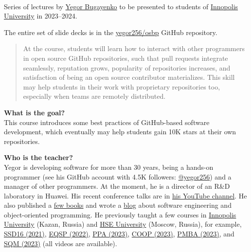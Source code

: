 \documentclass[nobrand,anonymous,nodate,nosecurity]{huawei}
\begin{document}
{\\
Series of lectures by \href{https://www.yegor256.com}{Yegor Bugayenko} to be presented
to students of \href{https://innopolis.university/en/}{Innopolis University} in 2023--2024.

The entire set of slide decks is in the \href{https://github.com/yegor256/osbp}{yegor256/osbp} GitHub repository.

\begin{abstract}
At the course, students will learn how to interact with other programmers
in open source GitHub repositories, such that pull requests integrate seamlessly,
reputation grows, popularity of repositories increases, and satisfaction
of being an open source contributor materializes. This skill may help students
in their work with proprietary repositories too, especially when teams
are remotely distributed.
\end{abstract}

\textbf{What is the goal?}\\
This course introduces some best practices of GitHub-based software development,
which eventually may help students gain 10K stars at their own repositories.

\textbf{Who is the teacher?}\\
Yegor is developing software for more than 30 years, being a hands-on programmer
(see his GitHub account with 4.5K followers: \href{https://github.com/yegor256}{@yegor256})
and a manager of other programmers. At the moment, he is a director
of an R\&D laboratory in Huawei. His recent conference talks are in
\href{https://www.youtube.com/channel/UCr9qCdqXLm2SU0BIs6d_68Q}{his YouTube channel}.
He also published a \href{https://www.yegor256.com/books.html}{few books}
and wrote a \href{https://www.yegor256.com/contents.html}{blog} about software engineering
and object-oriented programming.
He previously taught a few courses in
\href{https://innopolis.university/}{Innopolis University} (Kazan, Russia)
and
\href{https://hse.ru}{HSE University} (Moscow, Russia),
for example,
\href{https://github.com/yegor256/ssd16}{SSD16 (2021)},
\href{https://github.com/yegor256/eqsp}{EQSP (2022)},
\href{https://github.com/yegor256/ppa}{PPA (2023)},
\href{https://github.com/yegor256/painofoop}{COOP (2023)},
\href{https://github.com/yegor256/pmba}{PMBA (2023)},
and
\href{https://github.com/yegor256/sqm}{SQM (2023)}
(all videos are available).

}
\end{document}
